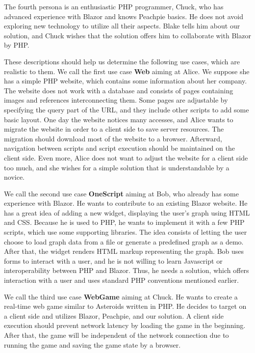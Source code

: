 \par
The fourth persona is an enthusiastic PHP programmer, Chuck, who has advanced experience with Blazor and knows Peachpie basics.
He does not avoid exploring new technology to utilize all their aspects.
Blake tells him about our solution, and Chuck wishes that the solution offers him to collaborate with Blazor by PHP.
\par
These descriptions should help us determine the following use cases, which are realistic to them.
We call the first use case \textbf{Web} aiming at Alice.
We suppose she has a simple PHP website, which contains some information about her company.
The website does not work with a database and consists of pages containing images and references interconnecting them.
Some pages are adjustable by specifying the query part of the URL, and they include other scripts to add some basic layout.
One day the website notices many accesses, and Alice wants to migrate the website in order to a client side to save server resources.
The migration should download most of the website to a browser.
Afterward, navigation between scripts and script execution should be maintained on the client side.
Even more, Alice does not want to adjust the website for a client side too much, and she wishes for a simple solution that is understandable by a novice.
\par
We call the second use case \textbf{OneScript} aiming at Bob, who already has some experience with Blazor.
He wants to contribute to an existing Blazor website.
He has a great idea of adding a new widget, displaying the user's graph using HTML and CSS.
Because he is used to PHP, he wants to implement it with a few PHP scripts, which use some supporting libraries.
The idea consists of letting the user choose to load graph data from a file or generate a predefined graph as a demo.
After that, the widget renders HTML markup representing the graph.
Bob uses forms to interact with a user, and he is not willing to learn Javascript or interoperability between PHP and Blazor.
Thus, he needs a solution, which offers interaction with a user and uses standard PHP conventions mentioned earlier.
\par
We call the third use case \textbf{WebGame} aiming at Chuck.
He wants to create a real-time web game similar to Asteroids written in PHP.
He decides to target on a client side and utilizes Blazor, Peachpie, and our solution.
A client side execution should prevent network latency by loading the game in the beginning.
After that, the game will be independent of the network connection due to running the game and saving the game state by a browser.
